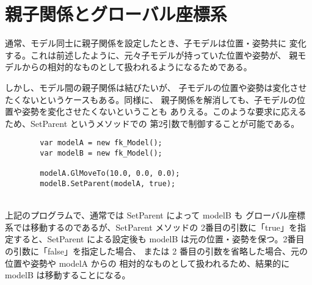 \section{親子関係とグローバル座標系} \label{sec:modelglobal}
通常、モデル同士に親子関係を設定したとき、子モデルは位置・姿勢共に
変化する。これは前述したように、元々子モデルが持っていた位置や姿勢が、
親モデルからの相対的なものとして扱われるようになるためである。

しかし、モデル間の親子関係は結びたいが、
子モデルの位置や姿勢は変化させたくないというケースもある。同様に、
親子関係を解消しても、子モデルの位置や姿勢を変化させたくないということも
ありえる。このような要求に応えるため、SetParent というメソッドでの
第2引数で制御することが可能である。
\\
\begin{breakbox}
\begin{verbatim}
        var modelA = new fk_Model();
        var modelB = new fk_Model();

        modelA.GlMoveTo(10.0, 0.0, 0.0);
        modelB.SetParent(modelA, true);
\end{verbatim}
\end{breakbox}
~ \\
上記のプログラムで、通常では SetParent によって modelB も
グローバル座標系では移動するのであるが、SetParent メソッドの
2番目の引数に「true」を指定すると、SetParent による設定後も
modelB は元の位置・姿勢を保つ。2番目の引数に「false」を指定した場合、
または 2 番目の引数を省略した場合、元の位置や姿勢や modelA からの
相対的なものとして扱われるため、結果的に modelB は移動することになる。

